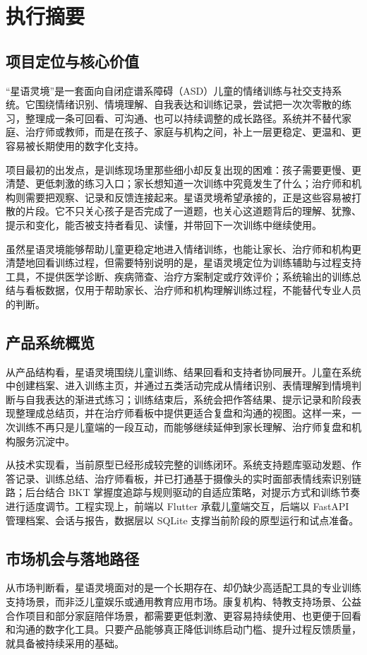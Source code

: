 \chapter{执行摘要}

\section{项目定位与核心价值}
“星语灵境”是一套面向自闭症谱系障碍（ASD）儿童的情绪训练与社交支持系统。它围绕情绪识别、情境理解、自我表达和训练记录，尝试把一次次零散的练习，整理成一条可回看、可沟通、也可以持续调整的成长路径。系统并不替代家庭、治疗师或教师，而是在孩子、家庭与机构之间，补上一层更稳定、更温和、更容易被长期使用的数字化支持。

项目最初的出发点，是训练现场里那些细小却反复出现的困难：孩子需要更慢、更清楚、更低刺激的练习入口；家长想知道一次训练中究竟发生了什么；治疗师和机构则需要把观察、记录和反馈连接起来。星语灵境希望承接的，正是这些容易被打散的片段。它不只关心孩子是否完成了一道题，也关心这道题背后的理解、犹豫、提示和变化，能否被支持者看见、读懂，并带回下一次训练中继续使用。

虽然星语灵境能够帮助儿童更稳定地进入情绪训练，也能让家长、治疗师和机构更清楚地回看训练过程，但需要特别说明的是，星语灵境定位为训练辅助与过程支持工具，不提供医学诊断、疾病筛查、治疗方案制定或疗效评价；系统输出的训练总结与看板数据，仅用于帮助家长、治疗师和机构理解训练过程，不能替代专业人员的判断。

\section{产品系统概览}
从产品结构看，星语灵境围绕儿童训练、结果回看和支持者协同展开。儿童在系统中创建档案、进入训练主页，并通过五类活动完成从情绪识别、表情理解到情境判断与自我表达的渐进式练习；训练结束后，系统会把作答结果、提示记录和阶段表现整理成总结页，并在治疗师看板中提供更适合复盘和沟通的视图。这样一来，一次训练不再只是儿童端的一段互动，而能够继续延伸到家长理解、治疗师复盘和机构服务沉淀中。

从技术实现看，当前原型已经形成较完整的训练闭环。系统支持题库驱动发题、作答记录、训练总结、治疗师看板，并已打通基于摄像头的实时面部表情线索识别链路；后台结合 BKT 掌握度追踪与规则驱动的自适应策略，对提示方式和训练节奏进行适度调节。工程实现上，前端以 Flutter 承载儿童端交互，后端以 FastAPI 管理档案、会话与报告，数据层以 SQLite 支撑当前阶段的原型运行和试点准备。

\section{市场机会与落地路径}
从市场判断看，星语灵境面对的是一个长期存在、却仍缺少高适配工具的专业训练支持场景，而非泛儿童娱乐或通用教育应用市场。康复机构、特教支持场景、公益合作项目和部分家庭陪伴场景，都需要更低刺激、更容易持续使用、也更便于回看和沟通的数字化工具。只要产品能够真正降低训练启动门槛、提升过程反馈质量，就具备被持续采用的基础。


